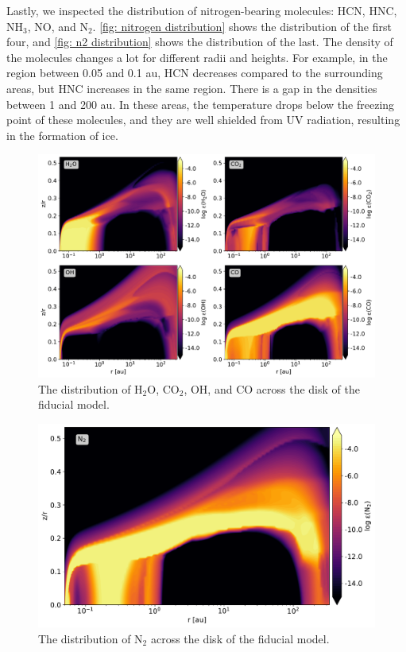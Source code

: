 \documentclass[twoside, single, authoryear, semicolon]{lion-msc}
\newcommand{\4}{$_4$}
\newcommand{\3}{$_3$}
\newcommand{\2}{$_2$}
\begin{document}

Lastly, we inspected the distribution of nitrogen-bearing molecules: HCN, HNC, NH\3, NO, and N\2. \autoref{fig: nitrogen distribution} shows the distribution of the first four, and \autoref{fig: n2 distribution} shows the distribution of the last. The density of the molecules changes a lot for different radii and heights. For example, in the region between 0.05 and 0.1 au, HCN decreases compared to the surrounding areas, but HNC increases in the same region. There is a gap in the densities between 1 and 200 au. In these areas, the temperature drops below the freezing point of these molecules, and they are well shielded from UV radiation, resulting in the formation of ice. 


\begin{figure}[!ht]
    \centering
    \includegraphics[width=\linewidth]{Figures/Abundance1.pdf}
    \caption{The distribution of H\2O, CO\2, OH, and CO across the disk of the fiducial model.}
    \label{fig: others distribution}
\end{figure}

\begin{figure}[!ht]
    \centering
    \includegraphics[width=.5\linewidth]{Figures/AbundanceN2.pdf}
    \caption{The distribution of N\2 across the disk of the fiducial model.}
    \label{fig: n2 distribution}
\end{figure}
\end{document}

